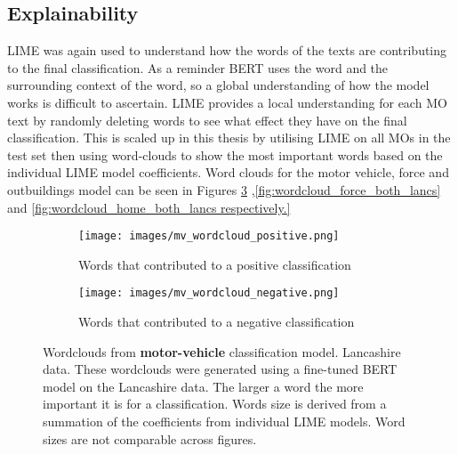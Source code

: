 \subsection{Explainability} LIME was again used to understand how the words of the texts are contributing to the final classification. As a reminder BERT uses the word and the surrounding context of the word, so a global understanding of how the model works is difficult to ascertain. LIME provides a local understanding for each MO text by randomly deleting words to see what effect they have on the final classification. This is scaled up in this thesis by utilising LIME on all MOs in the test set then using word-clouds to show the most important words based on the individual LIME model coefficients. Word clouds for the motor vehicle, force and outbuildings model can be seen in Figures \ref{fig:wordcloud_mv_both_lancs} ,\ref{fig:wordcloud_force_both_lancs} and \ref{fig:wordcloud_home_both_lancs respectively.}

\begin{figure}
     \centering
     \begin{subfigure}[b]{0.9\textwidth}
         \centering
         \texttt{[image: images/mv\_wordcloud\_positive.png]}
         \caption{Words that contributed to a positive classification}
         \label{fig: wordcloud_mv_lancs}
     \end{subfigure}
     \vfill
     \begin{subfigure}[b]{0.9\textwidth}
         \centering
         \texttt{[image: images/mv\_wordcloud\_negative.png]}
         \caption{Words that contributed to a negative classification}
         \label{fig: wordcloud_mv_rev_lancs}
     \end{subfigure}
        \caption{{Wordclouds from  \textbf{motor-vehicle} classification model. Lancashire data.} These wordclouds were generated using a fine-tuned BERT model on the Lancashire data. The larger a word the more important it is for a classification. Words size is derived from a summation of the coefficients from individual LIME models. Word sizes are not comparable across figures.}
        \label{fig:wordcloud_mv_both_lancs}
        
\end{figure}


